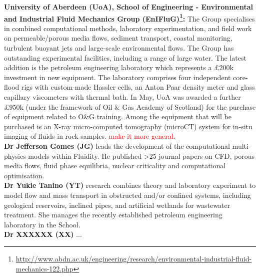 \documentclass[12pts,a4paper,amsmath,amssymb,floatfix]{article}%
\newcommand{\red}{\textcolor{red}}
\begin{document}
%
{\bf University of Aberdeen (UoA), School of Engineering - Environmental and Industrial Fluid Mechanics Group (EnIFluG)\footnote{\href{http://www.abdn.ac.uk/engineering/research/environmental-industrial-fluid-mechanics-122.php}{http://www.abdn.ac.uk/engineering/research/environmental-industrial-fluid-mechanics-122.php}}:} The Group specialises in combined computational methods, laboratory experimentation, and field work on permeable/porous media flows, sediment transport, coastal monitoring, turbulent buoyant jets and large-scale environmental flows. The Group has outstanding experimental facilities, including a range of large water. The latest addition is the petroleum engineering laboratory which represents a \pounds 200k investment in new equipment. The laboratory comprises four independent core-flood rigs with custom-made Hassler cells, an Anton Paar density meter and glass capillary viscometers with thermal bath. In May, UoA was awarded a further \pounds 950k (under the framework of Oil $\&$ Gas Academy of Scotland) for the purchase of equipment related to O$\&$G training. Among the equipment that will be purchased is an X-ray micro-computed tomography (microCT) system for in-situ imaging of fluids in rock samples. \red{make it more general}. \\

\medskip
{\bf Dr Jefferson Gomes (JG)} leads the development of the computational multi-physics models within Fluidity. He published >25 journal papers on CFD, porous media flows, fluid phase equilibria, nuclear criticality and computational optimisation.\\

\medskip
{\bf Dr Yukie Tanino (YT)} research combines theory and laboratory experiment to model flow and mass transport in obstructed and/or confined systems, including geological reservoirs, inclined pipes, and artificial wetlands for wastewater treatment. She manages the recently established petroleum engineering laboratory in the School.\\

\medskip
{\bf Dr XXXXXX (XX)} ...
\end{document}
